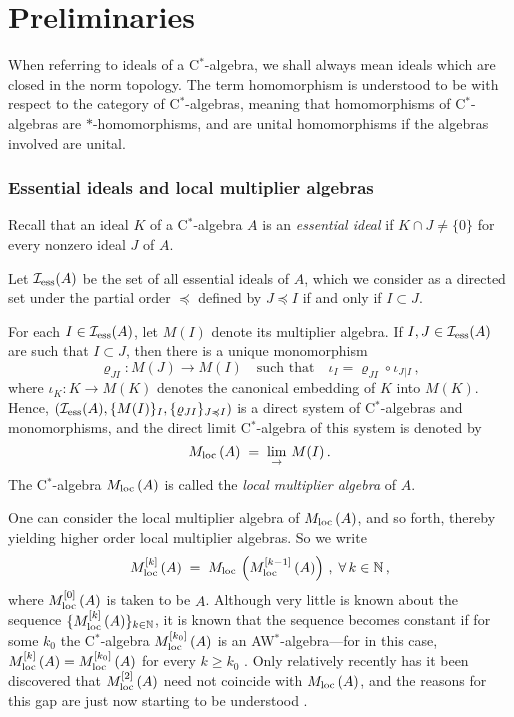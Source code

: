 \documentclass{amsart}
\theoremstyle{definition}
\theoremstyle{remark}
\begin{document}
\section{Preliminaries}\label{S:prelim}

When referring to ideals of a C$^*$-algebra, we shall always mean ideals which are closed in the norm topology.
The term homomorphism is understood to be with respect to the category of C$^*$-algebras, meaning that
homomorphisms of C$^*$-algebras are $*$-homomorphisms, and are unital homomorphisms if the algebras involved are unital.

\subsubsection*{Essential ideals and local multiplier algebras}

Recall that an ideal $K$ of a C$^*$-algebra $A$ is an \emph{essential ideal} if
$K\cap J\neq\{0\}$ for every nonzero ideal $J$ of $A$.

Let  $\mathcal I_{\rm ess}(A)$ be the set of all essential ideals of $A$, which we consider
as a directed set under the partial order $ \preccurlyeq$ defined by
$ J \preccurlyeq I$ {if and only if} $I\subset J$.

For each $I\in \mathcal I_{\rm ess}(A)$, let $M(I)$ denote its {multiplier algebra}. If
$I,J\in \mathcal I_{\rm ess}(A)$ are such that
$I\subset J$, then there is a unique monomorphism
\begin{equation}\label{ma-incl}
\varrho_{JI}:M(J)\rightarrow M(I)\quad\mbox{such that}\quad
\iota_I=\varrho_{JI}\circ\iota_{J}{}_{\vert I}\,,
\end{equation}
where $\iota_K:K\rightarrow M(K)$
denotes the canonical embedding of $K$ into $M(K)$. Hence,
$(\mathcal I_{\rm ess}(A), \{M(I)\}_I, \{\varrho_{JI}\}_{J \preccurlyeq I})$ is a direct
system of C$^*$-algebras and monomorphisms, and the direct limit C$^*$-algebra
of this system is denoted by
\[
{M_{\rm loc}\,}(A)\;=\;\lim_{\rightarrow}\,M(I)\,.
\]
The C$^*$-algebra ${M_{\rm loc}\,}(A)$ is called the \emph{local multiplier algebra} of $A$.

One can consider the local multiplier algebra of ${M_{\rm loc}\,}(A)$, and so forth, thereby yielding
higher order local multiplier algebras. So we write
\[
{M_{\rm loc}^{[k]}\,}(A)\;=\;{M_{\rm loc}\,}\left({M_{\rm loc}^{[k-1]}\,}(A)\right) \,,\;\forall\,k\in\mathbb N\,,
\]
where ${M_{\rm loc}^{[0]}\,}(A)$ is taken to be $A$. Although
very little is known about the sequence $\{{M_{\rm loc}^{[k]}\,}(A)\}_{k\in\mathbb N}$, it is known that the sequence becomes constant if for some $k_0$
the C$^*$-algebra ${M_{\rm loc}^{[k_0]}\,}(A)$ is an AW$^*$-algebra---for in this case, ${M_{\rm loc}^{[k]}\,}(A)={M_{\rm loc}^{[k_0]}\,}(A)$ for every $k\geq k_0$
\cite[Theorem 2.3.8]{Ara--Mathieu-book}. Only relatively recently has it been discovered
\cite{ara-mathieu2006,ara-mathieu2008,argerami--farenick--massey2009} that ${M_{\rm loc}^{[2]}\,}(A)$ need not coincide with ${M_{\rm loc}\,}(A)$,
and the reasons for this gap are just now starting to be understood \cite{ara-mathieu2010}.
\end{document}

